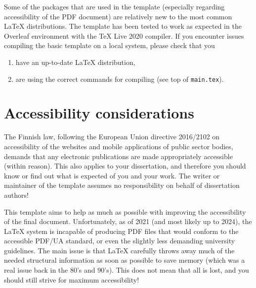 Some of the packages that are used in the template (especially regarding accessibility of the PDF document) are relatively new to the most common \LaTeX{} distributions. The template has been tested to work as expected in the Overleaf environment with the \TeX{} Live 2020 compiler. If you encounter issues compiling the basic template on a local system, please check that you
\begin{enumerate}
\item have an up-to-date \LaTeX{} distribution,
\item are using the correct commands for compiling (see top of \texttt{main.tex}).
\end{enumerate}

\section{Accessibility considerations}

The Finnish law, following the European Union directive 2016/2102 on accessibility of the websites and mobile applications of public sector bodies, demands that any electronic publications are made appropriately accessible (within reason). This also applies to your dissertation, and therefore you should know or find out what is expected of you and your work. The writer or maintainer of the template assumes no responsibility on behalf of dissertation authors!

This template aims to help as much as possible with improving the accessibility of the final document. Unfortunately, as of 2021 (and most likely up to 2024), the \LaTeX{} system is incapable of producing PDF files that would conform to the accessible PDF/UA standard, or even the slightly less demanding university guidelines. The main issue is that \LaTeX{} carefully throws away much of the needed structural information as soon as possible to save memory (which was a real issue back in the 80's and 90's). This does not mean that all is lost, and you should still strive for maximum accessibility!

